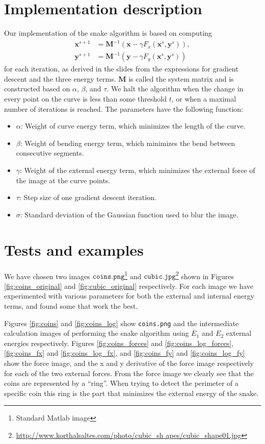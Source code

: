 \documentclass[11pt,a4paper]{article}
\begin{document}
\section{Implementation description}
%
Our implementation of the snake algorithm is based on computing
%
\begin{align}
\mathbf{x}^{s+1} &= \mathbf{M}^{-1} (\mathbf{x} - \gamma F_x(\mathbf{x}^s, \mathbf{y}^s)), \\
\mathbf{y}^{s+1} &= \mathbf{M}^{-1} (\mathbf{y} - \gamma F_y(\mathbf{x}^s, \mathbf{y}^s))
\end{align}
%
for each iteration, as derived in the slides from the expressions for
gradient descent and the three energy terms. $\mathbf{M}$ is called the
system matrix and is constructed based on $\alpha$, $\beta$, and $\tau$. We
halt the algorithm when the change in every point on the curve is less than
some threshold $t$, or when a maximal number of iterations is reached. The
parameters have the following function:
%
\begin{itemize}
    \item{$\alpha$: Weight of curve energy term, which minimizes the length of
        the curve.}
    \item{$\beta$: Weight of bending energy term, which minimizes the bend between
        consecutive segments.}
    \item{$\gamma$: Weight of the external energy term, which minimizes the external
        force of the image at the curve points.}
    \item{$\tau$: Step size of one gradient descent iteration.}
    \item{$\sigma$: Standard deviation of the Gaussian function used to blur the
        image.}
\end{itemize}
%
\section{Tests and examples}
%
We have chosen two images
$\texttt{coins.png}$\footnote{Standard Matlab image} and
$\texttt{cubic.jpg}$\footnote{\url{http://www.korthalsaltes.com/photo/cubic_sh
apes/cubic_shape01.jpg}} shown in Figures \ref{fig:coins_original} and
\ref{fig:cubic_original} respectively. For each image we have experimented
with various parameters for both the external and internal energy terms, and
found some that work the best.

Figures \ref{fig:coins} and \ref{fig:coins_log} show \texttt{coins.png} and
the intermediate calculation images of performing the snake algorithm using
$E_1$ and $E_2$ external energies respectively.
Figures \ref{fig:coins_forces} and \ref{fig:coins_log_forces},
\ref{fig:coins_fx} and \ref{fig:coins_log_fx}, and \ref{fig:coins_fy} and
\ref{fig:coins_log_fy} show
the force image, and the x and y derivative of the force image respectively for
each of the two external forces.
From the force image we clearly see that the coins are represented by a
``ring''. When trying to detect the perimeter of a specific coin this ring is
the part that minimizes the external energy of the snake.
\end{document}
